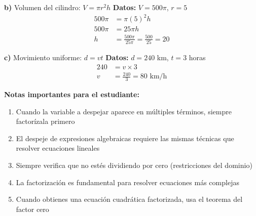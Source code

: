 \textbf{b)} Volumen del cilindro: $V = \pi r^2 h$
\textbf{Datos:} $V = 500\pi$, $r = 5$
\begin{align}
500\pi &= \pi (5)^2 h\\
500\pi &= 25\pi h\\
h &= \frac{500\pi}{25\pi} = \frac{500}{25} = 20
\end{align}

\textbf{c)} Movimiento uniforme: $d = vt$
\textbf{Datos:} $d = 240$ km, $t = 3$ horas
\begin{align}
240 &= v \times 3\\
v &= \frac{240}{3} = 80 \text{ km/h}
\end{align}

\textbf{Notas importantes para el estudiante:}
\begin{enumerate}
\item Cuando la variable a despejar aparece en múltiples términos, siempre factorízala primero
\item El despeje de expresiones algebraicas requiere las mismas técnicas que resolver ecuaciones lineales
\item Siempre verifica que no estés dividiendo por cero (restricciones del dominio)
\item La factorización es fundamental para resolver ecuaciones más complejas
\item Cuando obtienes una ecuación cuadrática factorizada, usa el teorema del factor cero
\end{enumerate}